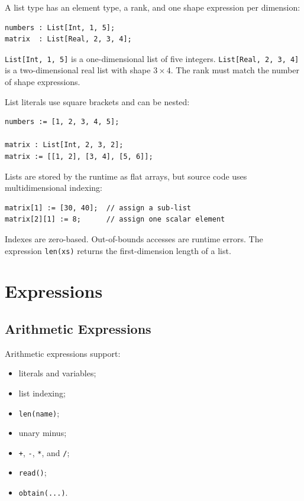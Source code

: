 \documentclass[11pt]{article}
\begin{document}
A list type has an element type, a rank, and one shape expression per dimension:

\begin{lstlisting}
numbers : List[Int, 1, 5];
matrix  : List[Real, 2, 3, 4];
\end{lstlisting}

\texttt{List[Int, 1, 5]} is a one-dimensional list of five integers. \texttt{List[Real, 2, 3, 4]} is a two-dimensional real list with shape $3 \times 4$. The rank must match the number of shape expressions.

List literals use square brackets and can be nested:

\begin{lstlisting}
numbers := [1, 2, 3, 4, 5];

matrix : List[Int, 2, 3, 2];
matrix := [[1, 2], [3, 4], [5, 6]];
\end{lstlisting}

Lists are stored by the runtime as flat arrays, but source code uses multidimensional indexing:

\begin{lstlisting}
matrix[1] := [30, 40];  // assign a sub-list
matrix[2][1] := 8;      // assign one scalar element
\end{lstlisting}

Indexes are zero-based. Out-of-bounds accesses are runtime errors. The expression \texttt{len(xs)} returns the first-dimension length of a list.

\section{Expressions}

\subsection{Arithmetic Expressions}

Arithmetic expressions support:

\begin{itemize}[nosep]
  \item literals and variables;
  \item list indexing;
  \item \texttt{len(name)};
  \item unary minus;
  \item \texttt{+}, \texttt{-}, \texttt{*}, and \texttt{/};
  \item \texttt{read()};
  \item \texttt{obtain(...)}.
\end{itemize}
\end{document}
